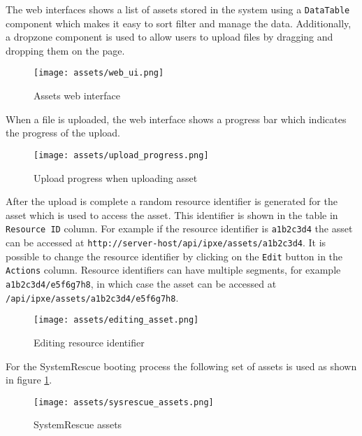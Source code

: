 \documentclass[../main.tex]{subfiles}
\begin{document}
The web interfaces shows a list of assets stored in the system using a \texttt{DataTable} component which makes it easy to sort filter and manage the data.
Additionally, a dropzone component is used to allow users to upload files by dragging and dropping them on the page.

\begin{figure}[H]
  \centering
  \texttt{[image: assets/web\_ui.png]}
  \caption{Assets web interface}
\end{figure}

When a file is uploaded, the web interface shows a progress bar which indicates the progress of the upload.

\begin{figure}[H]
  \centering
  \texttt{[image: assets/upload\_progress.png]}
  \caption{Upload progress when uploading asset}
\end{figure}

After the upload is complete a random resource identifier is generated for the asset which is used to access the asset.
This identifier is shown in the table in \texttt{Resource ID} column.
For example if the resource identifier is \texttt{a1b2c3d4} the asset can be accessed at \texttt{http://server-host/api/ipxe/assets/a1b2c3d4}.
It is possible to change the resource identifier by clicking on the \texttt{Edit} button in the \texttt{Actions} column.
Resource identifiers can have multiple segments, for example \texttt{a1b2c3d4/e5f6g7h8}, in which case the asset can be accessed at \texttt{/api/ipxe/assets/a1b2c3d4/e5f6g7h8}.

\begin{figure}[H]
  \centering
  \texttt{[image: assets/editing\_asset.png]}
  \caption{Editing resource identifier}
\end{figure}

For the SystemRescue booting process the following set of assets is used as shown in figure \ref{fig:sysrescue-assets}.

\begin{figure}[H]
  \centering
  \texttt{[image: assets/sysrescue\_assets.png]}
  \caption{SystemRescue assets}
  \label{fig:sysrescue-assets}
\end{figure}
\end{document}
